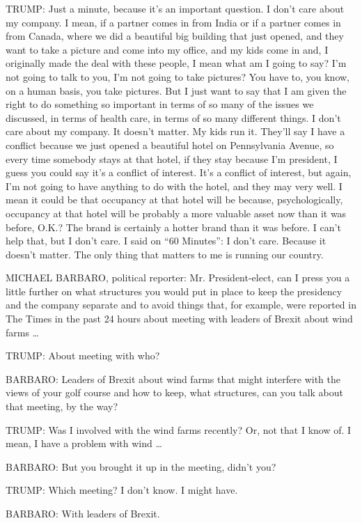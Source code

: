 TRUMP: Just a minute, because it's an important question. I don't care
about my company. I mean, if a partner comes in from India or if a
partner comes in from Canada, where we did a beautiful big building that
just opened, and they want to take a picture and come into my office,
and my kids come in and, I originally made the deal with these people, I
mean what am I going to say? I'm not going to talk to you, I'm not going
to take pictures? You have to, you know, on a human basis, you take
pictures. But I just want to say that I am given the right to do
something so important in terms of so many of the issues we discussed,
in terms of health care, in terms of so many different things. I don't
care about my company. It doesn't matter. My kids run it. They'll say I
have a conflict because we just opened a beautiful hotel on Pennsylvania
Avenue, so every time somebody stays at that hotel, if they stay because
I'm president, I guess you could say it's a conflict of interest. It's a
conflict of interest, but again, I'm not going to have anything to do
with the hotel, and they may very well. I mean it could be that
occupancy at that hotel will be because, psychologically, occupancy at
that hotel will be probably a more valuable asset now than it was
before, O.K.? The brand is certainly a hotter brand than it was before.
I can't help that, but I don't care. I said on ``60 Minutes'': I don't
care. Because it doesn't matter. The only thing that matters to me is
running our country.

MICHAEL BARBARO, political reporter: Mr. President-elect, can I press
you a little further on what structures you would put in place to keep
the presidency and the company separate and to avoid things that, for
example, were reported in The Times in the past 24 hours about meeting
with leaders of Brexit about wind farms \ldots{}

TRUMP: About meeting with who?

BARBARO: Leaders of Brexit about wind farms that might interfere with
the views of your golf course and how to keep, what structures, can you
talk about that meeting, by the way?

TRUMP: Was I involved with the wind farms recently? Or, not that I know
of. I mean, I have a problem with wind \ldots{}

BARBARO: But you brought it up in the meeting, didn't you?

TRUMP: Which meeting? I don't know. I might have.

BARBARO: With leaders of Brexit.

